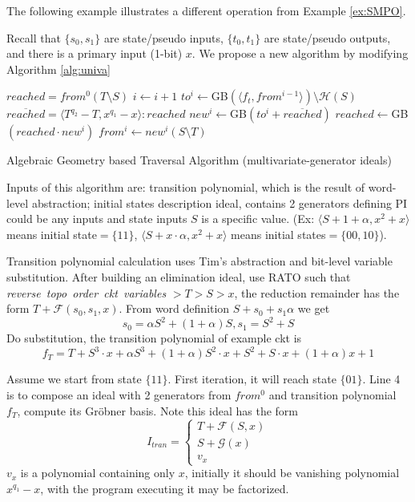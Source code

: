 The following example illustrates a different operation from Example \ref{ex:SMPO}.
\begin{Example}
Recall that 
$\{s_0, s_1\}$ are state/pseudo inputs, $\{t_0,t_1\}$ are state/pseudo outputs, and there is a primary input (1-bit) 
$x$. We propose a new algorithm by modifying Algorithm \ref{alg:univa}

\begin{algorithm}[hbt]
\SetAlgoNoLine

  $reached = from^0(T\setminus S)$\;
  {
  	$i \gets i + 1$\;
	$to^i \gets$GB$(\langle f_t, from^{i-1}\rangle) \setminus \mathcal H(S)$\;
	$\overline{reached} = \langle T^{q_2}-T, x^{q_1} - x \rangle : reached$\;
	$new^i \gets $GB$(to^i + \overline{reached})$\;
  	$reached \gets $GB$( reached \cdot new^i)$\;
	$from^i \gets new^i(S\setminus T)$\;
  }
\caption {Algebraic Geometry based Traversal Algorithm (multivariate-generator ideals)}\label{alg:multi}
\end{algorithm}

Inputs of this algorithm are: transition polynomial, which is the result of word-level abstraction; initial 
states description ideal, contains 2 generators defining PI could be any inputs and state inputs $S$ is a specific
value. (Ex: $\langle S+1+\alpha, x^2+x\rangle$ means initial state$=\{11\}$,
$\langle S+x\cdot\alpha, x^2+x\rangle$ means initial states$=\{00,10\}$).

Transition polynomial calculation uses Tim's abstraction and bit-level variable substitution. After building
an elimination ideal, use RATO such that \emph{reverse\ topo\ order\ ckt\ variables }$> T > S > x$, the reduction
remainder has the form $T+\mathcal F(s_0,s_1,x)$. From word definition $S+s_0+s_1\alpha$ we get
$$s_0 = \alpha S^2+ (1+\alpha)S, s_1 = S^2+S$$
Do substitution, the transition polynomial of example ckt is 
$$f_T = T+S^3\cdot x+\alpha S^3+(1+\alpha)S^2\cdot x+S^2+S\cdot x+(1+\alpha)x+1$$

Assume we start from state $\{11\}$. First iteration, it will reach state $\{01\}$. Line 4 is to compose an
ideal with 2 generators from $from^0$ and transition polynomial $f_T$, compute its Gr\"obner basis. Note this ideal
has the form
\begin{equation}
I_{tran} = \left\{
             \begin{array}{c}
             T+\mathcal F(S,x) \\
             S + \mathcal G(x) \\
             v_x
             \end{array}  
        \right.
\end {equation}
$v_x$ is a polynomial containing only $x$, initially it should be vanishing polynomial $x^{q_1}-x$, with the program executing
it may be factorized.


\end{Example}
